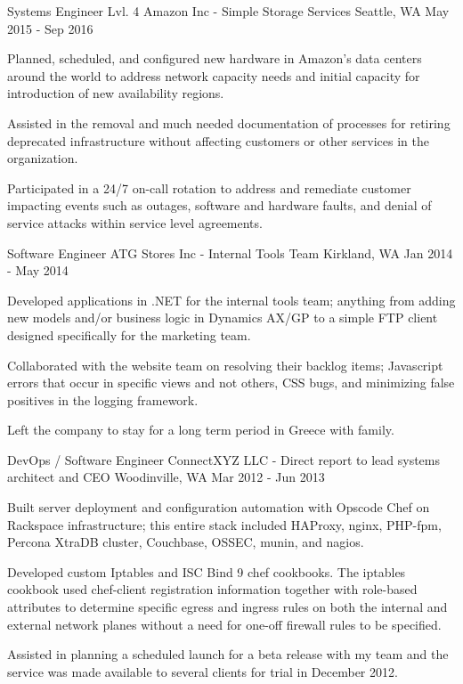 
    \begin{cventries}
    
    \cventry
    {Systems Engineer Lvl. 4}
    {Amazon Inc - Simple Storage Services}
    {Seattle, WA}
    {May 2015 - Sep 2016}
    {
        \begin{cvitems}
        \item {Planned, scheduled, and configured new hardware in Amazon's data centers around the world to address network capacity needs and initial capacity for introduction of new availability regions.}
        \item {Assisted in the removal and much needed documentation of processes for retiring deprecated infrastructure without affecting customers or other services in the organization.}
        \item {Participated in a 24/7 on-call rotation to address and remediate customer impacting events such as outages, software and hardware faults, and denial of service attacks within service level agreements.}
        \end{cvitems}
    }

    \cventry
    {Software Engineer}
    {ATG Stores Inc - Internal Tools Team}
    {Kirkland, WA}
    {Jan 2014 - May 2014}
    {
        \begin{cvitems}
        \item {Developed applications in .NET for the internal tools team; anything from adding new models and/or business logic in Dynamics AX/GP to a simple FTP client designed specifically for the marketing team.}
        \item {Collaborated with the website team on resolving their backlog items; Javascript errors that occur in specific views and not others, CSS bugs, and minimizing false positives in the logging framework.}
        \item {Left the company to stay for a long term period in Greece with family.}
        \end{cvitems}
    }

    \cventry
    {DevOps / Software Engineer}
    {ConnectXYZ LLC - Direct report to lead systems architect and CEO}
    {Woodinville, WA}
    {Mar 2012 - Jun 2013}
    {
        \begin{cvitems}
        \item {Built server deployment and configuration automation with Opscode Chef on Rackspace infrastructure; this entire stack included HAProxy, nginx, PHP-fpm, Percona XtraDB cluster, Couchbase, OSSEC, munin, and nagios.}
        \item {Developed custom Iptables and ISC Bind 9 chef cookbooks. The iptables cookbook used chef-client registration information together with role-based attributes to determine specific egress and ingress rules on both the internal and external network planes without a need for one-off firewall rules to be specified.}
        \item {Assisted in planning a scheduled launch for a beta release with my team and the service was made available to several clients for trial in December 2012.}
        \end{cvitems}
    }


\end{cventries}
